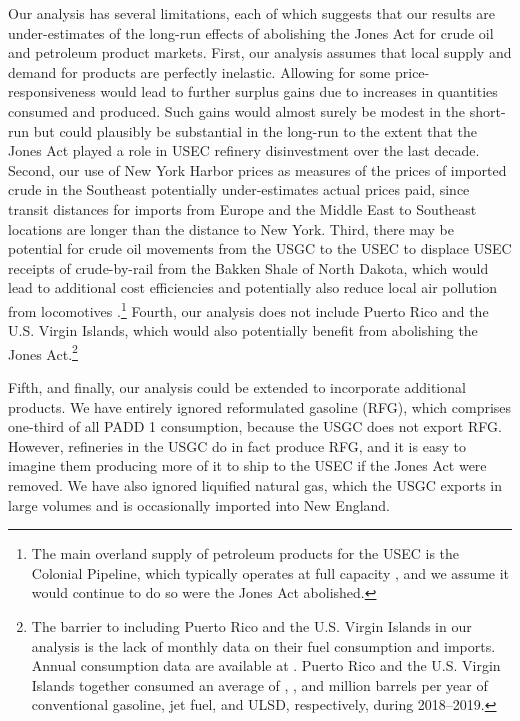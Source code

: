 \documentclass[12pt]{article}
\begin{document}
Our analysis has several limitations, each of which suggests that our results are under-estimates of the long-run effects of abolishing the Jones Act for crude oil and petroleum product markets. First, our analysis assumes that local supply and demand for products are perfectly inelastic. Allowing for some price-responsiveness would lead to further surplus gains due to increases in quantities consumed and produced. Such gains would almost surely be modest in the short-run but could plausibly be substantial in the long-run to the extent that the Jones Act played a role in USEC refinery disinvestment over the last decade. Second, our use of New York Harbor prices as measures of the prices of imported crude in the Southeast potentially under-estimates actual prices paid, since transit distances for imports from Europe and the Middle East to Southeast locations are longer than the distance to New York. Third, there may be potential for crude oil movements from the USGC to the USEC to displace USEC receipts of crude-by-rail from the Bakken Shale of North Dakota, which would lead to additional cost efficiencies and potentially also reduce local air pollution from locomotives \citep{clay2019,covertkellogg2023}.\footnote{The main overland supply of petroleum products for the USEC is the Colonial Pipeline, which typically operates at full capacity \citep{EIAcolonialflow}, and we assume it would continue to do so were the Jones Act abolished.} Fourth, our analysis does not include Puerto Rico and the U.S. Virgin Islands, which would also potentially benefit from abolishing the Jones Act.\footnote{The barrier to including Puerto Rico and the U.S. Virgin Islands in our analysis is the lack of monthly data on their fuel consumption and imports. Annual consumption data are available at \cite{EIAintl}. Puerto Rico and the U.S. Virgin Islands together consumed an average of \unskip, \unskip, and million barrels per year of conventional gasoline, jet fuel, and ULSD, respectively, during 2018--2019.}

Fifth, and finally, our analysis could be extended to incorporate additional products. We have entirely ignored reformulated gasoline (RFG), which comprises one-third of all PADD 1 consumption, because the USGC does not export RFG. However, refineries in the USGC do in fact produce RFG, and it is easy to imagine them producing more of it to ship to the USEC if the Jones Act were removed. We have also ignored liquified natural gas, which the USGC exports in large volumes and is occasionally imported into New England.
\end{document}
